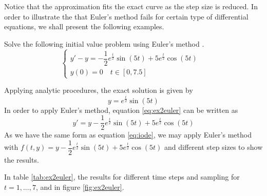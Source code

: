 Notice that the approximation fits the exact curve as the step size is reduced. In order to illustrate the that Euler's method fails for certain type of differential equations, we shall present the following examples.

\begin{exmp}
Solve the following initial value problem using Euler's method \cite{exampleeuler}.
\begin{equation}
\begin{cases}
    y'-y=-\dfrac{1}{2}e^{\frac{t}{2}}\sin(5t)+5e^{\frac{t}{2}}\cos(5t)&\\ y(0)=0\quad t\in[0,7.5]&
\end{cases}
\end{equation}\label{eq:ex2euler}
\end{exmp}
Applying analytic procedures, the exact solution is given by
\begin{equation}
    y=e^{\frac{t}{2}}\sin(5t)
\end{equation}
In order to apply Euler's method, equation \eqref{eq:ex2euler} can be written as 
\begin{equation}
    y'= y-\dfrac{1}{2}e^{\frac{t}{2}}\sin(5t)+5e^{\frac{t}{2}}\cos(5t)
\end{equation}
As we have the same form as equation \eqref{eq:iode}, we may apply Euler's method with $f(t,y)=y-\dfrac{1}{2}e^{\frac{t}{2}}\sin(5t)+5e^{\frac{t}{2}}\cos(5t)$ and different step sizes to show the results. 

In table \ref{tab:ex2euler}, the results for different time steps and sampling for $t=1,...,7$, and in figure \ref{fig:ex2euler}.

